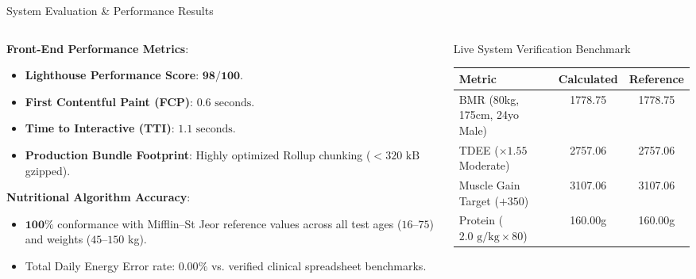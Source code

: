 \documentclass[aspectratio=169,10pt]{beamer}
\begin{document}
\begin{frame}{System Evaluation \& Performance Results}
  \begin{columns}[T]
    \begin{column}{0.5\textwidth}
      \textbf{Front-End Performance Metrics}:
      \begin{itemize}
        \item \textbf{Lighthouse Performance Score}: $\mathbf{98/100}$.
        \item \textbf{First Contentful Paint (FCP)}: $0.6\text{ seconds}$.
        \item \textbf{Time to Interactive (TTI)}: $1.1\text{ seconds}$.
        \item \textbf{Production Bundle Footprint}: Highly optimized Rollup chunking ($<320\text{ kB}$ gzipped).
      \end{itemize}
      \vspace{0.2cm}
      \textbf{Nutritional Algorithm Accuracy}:
      \begin{itemize}
        \item $\mathbf{100\%}$ conformance with Mifflin--St Jeor reference values across all test ages ($16$--$75$) and weights ($45$--$150$ kg).
        \item Total Daily Energy Error rate: $\mathbf{0.00\%}$ vs. verified clinical spreadsheet benchmarks.
      \end{itemize}
    \end{column}
    \begin{column}{0.5\textwidth}
      \begin{block}{Live System Verification Benchmark}
        \begin{table}[h]
          \centering
          \scriptsize
          \begin{tabular}{lcc}
            \toprule
            \textbf{Metric} & \textbf{Calculated} & \textbf{Reference} \\
            \midrule
            BMR (80kg, 175cm, 24yo Male) & 1778.75 & 1778.75 \\
            TDEE ($\times 1.55$ Moderate) & 2757.06 & 2757.06 \\
            Muscle Gain Target ($+350$) & 3107.06 & 3107.06 \\
            Protein ($2.0\text{ g/kg} \times 80$) & 160.00g & 160.00g \\

\end{tabular}
\end{table}
\end{block}
\end{column}
\end{columns}
\end{frame}
\end{document}
